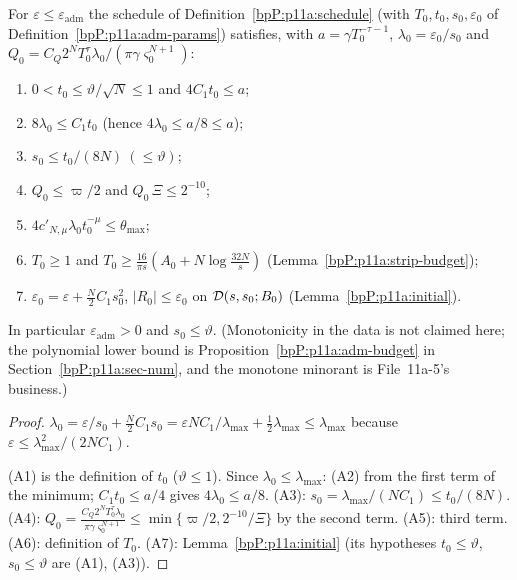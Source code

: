 \begin{proposition}\label{bpP:p11a:adm-choice}
For $\varepsilon\le\varepsilon_{\mathrm{adm}}$ the schedule of Definition~\ref{bpP:p11a:schedule} (with $T_0,t_0,s_0,\varepsilon_0$ of Definition~\ref{bpP:p11a:adm-params}) satisfies, with $a=\gamma T_0^{-\tau-1}$, $\lambda_0=\varepsilon_0/s_0$ and $Q_0=C_Q2^NT_0^\tau\lambda_0/(\pi\gamma\varsigma_0^{N+1})$:
\begin{enumerate}[label=(A\arabic*),ref=(A\arabic*)]
\item\label{bpP:p11a:A1} $0<t_0\le\vartheta/\sqrt N\le1$ and $4C_1t_0\le a$;
\item\label{bpP:p11a:A2} $8\lambda_0\le C_1t_0$ (hence $4\lambda_0\le a/8\le a$);
\item\label{bpP:p11a:A3} $s_0\le t_0/(8N)\ (\le\vartheta)$;
\item\label{bpP:p11a:A4} $Q_0\le\varpi/2$ and $Q_0\,\Xi\le2^{-10}$;
\item\label{bpP:p11a:A5} $4c'_{N,\mu}\lambda_0t_0^{-\mu}\le\theta_{\max}$;
\item\label{bpP:p11a:A6} $T_0\ge1$ and $T_0\ge\frac{16}{\pi s}(A_0+N\log\frac{32N}s)$ (Lemma~\ref{bpP:p11a:strip-budget});
\item\label{bpP:p11a:A7} $\varepsilon_0=\varepsilon+\frac N2C_1s_0^2$, $\lvert R_0\rvert\le\varepsilon_0$ on $\mathcal D(s,s_0;B_0)$ (Lemma~\ref{bpP:p11a:initial}).
\end{enumerate}
In particular $\varepsilon_{\mathrm{adm}}>0$ and $s_0\le\vartheta$. (Monotonicity in the data is not claimed here; the polynomial lower bound is Proposition~\ref{bpP:p11a:adm-budget} in Section~\ref{bpP:p11a:sec-num}, and the monotone minorant is File~11a-5's business.)
\end{proposition}
\begin{proof}
\proofstep{$\lambda_0\le\lambda_{\max}$}\label{stepP:p11a:ac-lam} $\lambda_0=\varepsilon/s_0+\frac N2C_1s_0=\varepsilon NC_1/\lambda_{\max}+\frac12\lambda_{\max}\le\lambda_{\max}$ because $\varepsilon\le\lambda_{\max}^2/(2NC_1)$.

\label{stepP:p11a:ac-list} (A1) is the definition of $t_0$ ($\vartheta\le1$). Since $\lambda_0\le\lambda_{\max}$: (A2) from the first term of the minimum; $C_1t_0\le a/4$ gives $4\lambda_0\le a/8$. (A3): $s_0=\lambda_{\max}/(NC_1)\le t_0/(8N)$. (A4): $Q_0=\frac{C_Q2^NT_0^\tau\lambda_0}{\pi\gamma\varsigma_0^{N+1}}\le\min\{\varpi/2,2^{-10}/\Xi\}$ by the second term. (A5): third term. (A6): definition of $T_0$. (A7): Lemma~\ref{bpP:p11a:initial} (its hypotheses $t_0\le\vartheta$, $s_0\le\vartheta$ are (A1), (A3)).
\end{proof}

